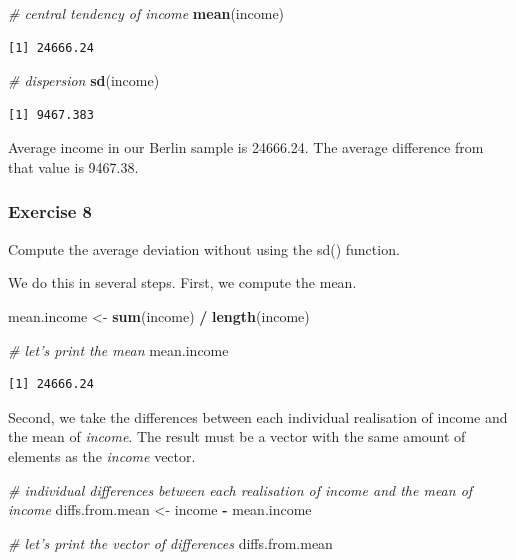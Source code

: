 \documentclass[]{article}
\newenvironment{Shaded}{\begin{snugshade}}{\end{snugshade}}
\newcommand{\KeywordTok}[1]{\textcolor[rgb]{0.13,0.29,0.53}{\textbf{#1}}}
\newcommand{\StringTok}[1]{\textcolor[rgb]{0.31,0.60,0.02}{#1}}
\newcommand{\CommentTok}[1]{\textcolor[rgb]{0.56,0.35,0.01}{\textit{#1}}}
\newcommand{\OperatorTok}[1]{\textcolor[rgb]{0.81,0.36,0.00}{\textbf{#1}}}
\newcommand{\NormalTok}[1]{#1}
\theoremstyle{definition}
\theoremstyle{definition}
\theoremstyle{definition}
\theoremstyle{remark}
\begin{document}
\begin{Shaded}
\begin{Highlighting}[]
\CommentTok{# central tendency of income}
\KeywordTok{mean}\NormalTok{(income)}
\end{Highlighting}
\end{Shaded}

\begin{verbatim}
[1] 24666.24
\end{verbatim}

\begin{Shaded}
\begin{Highlighting}[]
\CommentTok{# dispersion}
\KeywordTok{sd}\NormalTok{(income)}
\end{Highlighting}
\end{Shaded}

\begin{verbatim}
[1] 9467.383
\end{verbatim}

Average income in our Berlin sample is 24666.24. The average difference
from that value is 9467.38.

\subsubsection{Exercise 8}\label{exercise-8}

Compute the average deviation without using the sd() function.

We do this in several steps. First, we compute the mean.

\begin{Shaded}
\begin{Highlighting}[]
\NormalTok{mean.income <-}\StringTok{ }\KeywordTok{sum}\NormalTok{(income) }\OperatorTok{/}\StringTok{ }\KeywordTok{length}\NormalTok{(income)}

\CommentTok{# let's print the mean}
\NormalTok{mean.income}
\end{Highlighting}
\end{Shaded}

\begin{verbatim}
[1] 24666.24
\end{verbatim}

Second, we take the differences between each individual realisation of
income and the mean of \emph{income}. The result must be a vector with
the same amount of elements as the \emph{income} vector.

\begin{Shaded}
\begin{Highlighting}[]
\CommentTok{# individual differences between each realisation of income and the mean of income}
\NormalTok{diffs.from.mean <-}\StringTok{ }\NormalTok{income }\OperatorTok{-}\StringTok{ }\NormalTok{mean.income}

\CommentTok{# let's print the vector of differences}
\NormalTok{diffs.from.mean}
\end{Highlighting}
\end{Shaded}
\end{document}
